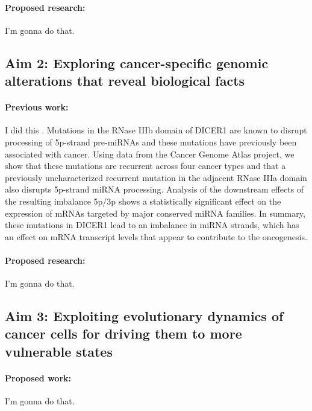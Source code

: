 \documentclass[12pt,letterpaper]{article}
\begin{document}
\paragraph{Proposed research:}
I'm gonna do that.

\subsection*{Aim 2: Exploring cancer-specific genomic alterations that reveal biological facts}
\paragraph{Previous work:}
I did this \cite{aksoy2014cancer}.
Mutations in the RNase IIIb domain of DICER1 are known to disrupt processing of 5p-strand pre-miRNAs and these mutations have previously been associated with cancer. 
Using data from the Cancer Genome Atlas project, we show that these mutations are recurrent across four cancer types and that a previously uncharacterized recurrent mutation in the adjacent RNase IIIa domain also disrupts 5p-strand miRNA processing. 
Analysis of the downstream effects of the resulting imbalance 5p/3p shows a statistically significant effect on the expression of mRNAs targeted by major conserved miRNA families. 
In summary, these mutations in DICER1 lead to an imbalance in miRNA strands, which has an effect on mRNA transcript levels that appear to contribute to the oncogenesis.

\paragraph{Proposed research:}
I'm gonna do that.

\subsection*{Aim 3: Exploiting evolutionary dynamics of cancer cells for driving them to more vulnerable states}
\paragraph{Proposed work:}
I'm gonna do that.

\clearpage

\footnotesize{
{}
}
\end{document}
